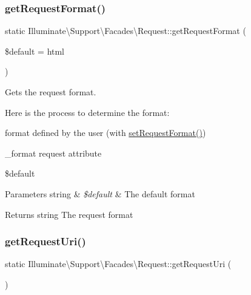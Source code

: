 \subsubsection{\texorpdfstring{get\+Request\+Format()}{getRequestFormat()}}
{\footnotesize\ttfamily static Illuminate\textbackslash{}\+Support\textbackslash{}\+Facades\textbackslash{}\+Request\+::get\+Request\+Format (\begin{DoxyParamCaption}\item[{}]{\$default = {\ttfamily \textquotesingle{}html\textquotesingle{}} }\end{DoxyParamCaption})\hspace{0.3cm}{\ttfamily [static]}}

Gets the request format.

Here is the process to determine the format\+:


\begin{DoxyItemize}
\item format defined by the user (with \mbox{\hyperlink{class_illuminate_1_1_support_1_1_facades_1_1_request_aaf9cb930a254f206113925d932c18b45}{set\+Request\+Format()}})
\item \+\_\+format request attribute
\item \$default
\end{DoxyItemize}


\begin{DoxyParams}[1]{Parameters}
string & {\em \$default} & The default format \\
\hline
\end{DoxyParams}
\begin{DoxyReturn}{Returns}
string The request format 
\end{DoxyReturn}
\mbox{\label{class_illuminate_1_1_support_1_1_facades_1_1_request_a91b1026ed524e8ece81eb56e47721256}} 
\subsubsection{\texorpdfstring{get\+Request\+Uri()}{getRequestUri()}}
{\footnotesize\ttfamily static Illuminate\textbackslash{}\+Support\textbackslash{}\+Facades\textbackslash{}\+Request\+::get\+Request\+Uri (\begin{DoxyParamCaption}{ }\end{DoxyParamCaption})\hspace{0.3cm}{\ttfamily [static]}}

